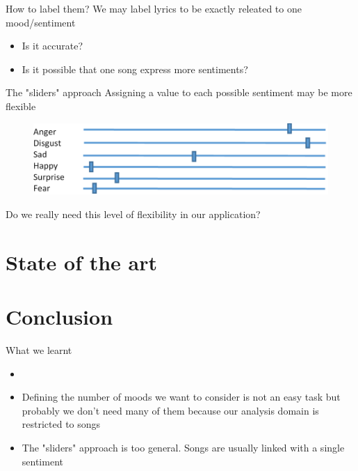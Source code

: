 \documentclass[xcolor=dvipsnames]{beamer}
\begin{document}
\begin{frame}{How to label them?}
We may label lyrics to be exactly releated to one mood/sentiment
\begin{itemize}
\item Is it accurate?
\item Is it possible that one song express more sentiments?
\end{itemize}
\end{frame}

\begin{frame}{The "sliders" approach}
Assigning a value to each possible sentiment may be more flexible
\begin{figure}
	\centering
	\includegraphics[width=\textwidth,height=0.8\textheight,keepaspectratio]{./images/emotion_labeling_sliders}
\end{figure}
Do we really need this level of flexibility in our application?
\end{frame}


\section{State of the art}


\section{Conclusion}

\begin{frame}{What we learnt}
\begin{itemize}
\item 
\item Defining the number of moods we want to consider is not an easy task but probably we don't
	need many of them because our analysis domain is restricted to songs
\item The "sliders" approach is too general. Songs are usually linked with a single sentiment
\end{itemize}
\end{frame}
\end{document}
